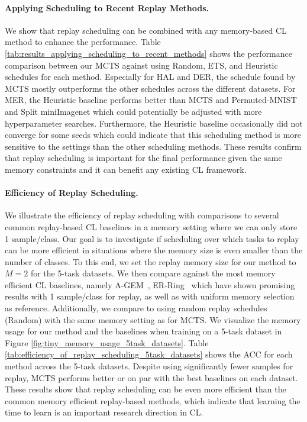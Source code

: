 \paragraph{Applying Scheduling to Recent Replay Methods.} We show that replay scheduling can be combined with any memory-based CL method to enhance the performance. %
Table \ref{tab:results_applying_scheduling_to_recent_methods} shows the performance comparison between our MCTS against using Random, ETS, and Heuristic schedules for each method. Especially for HAL and DER, the schedule found by MCTS mostly outperforms the other schedules across the different datasets. For MER, the Heuristic baseline performs better than MCTS and Permuted-MNIST and Split miniImagenet which could potentially be adjusted with more hyperparameter searches. Furthermore, the Heuristic baseline occasionally did not converge for some seeds which could indicate that this scheduling method is more sensitive to the settings than the other scheduling methods. These results confirm that replay scheduling is important for the final performance given the same memory constraints and it can benefit any existing CL framework. 




\vspace{-3mm}
\paragraph{Efficiency of Replay Scheduling.} We illustrate the efficiency of replay scheduling with comparisons to several common replay-based CL baselines in a memory setting where we can only store 1 sample/class.
Our goal is to investigate if scheduling over which tasks to replay can be more efficient in situations where the memory size is even smaller than the number of classes. 
To this end, we set the replay memory size for our method
to $M=2$ for the 5-task datasets. We then compare against the most memory efficient CL baselines, namely A-GEM~\cite{chaudhry2018efficient}, ER-Ring~\cite{chaudhry2019tiny} which have shown promising results with 1 sample/class for replay, as well as with uniform memory selection as reference. 
Additionally, we compare to using random replay schedules (Random) with the same memory setting as for MCTS.
We visualize the memory usage for our method and the baselines when training on a 5-task dataset in Figure \ref{fig:tiny_memory_usage_5task_datasets}. %
Table \ref{tab:efficiency_of_replay_scheduling_5task_datasets} shows the ACC for each method across the 5-task datasets. Despite using significantly fewer samples for replay, MCTS performs better or on par with the best baselines on each dataset. These results show that replay scheduling can be even more efficient than the common memory efficient replay-based methods, which indicate that learning the time to learn is an important research direction in CL.

